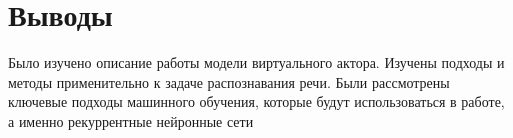 \section{Выводы}



Было изучено описание работы модели виртуального актора. Изучены подходы и методы применительно к задаче распознавания речи.
Были рассмотрены ключевые подходы машинного обучения, которые будут использоваться в работе, а именно рекуррентные нейронные сети
